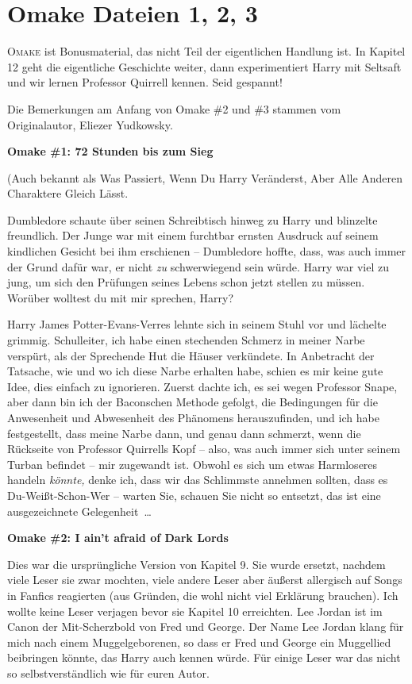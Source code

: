 \chapter{Omake Dateien 1, 2, 3}

\lettrine{\loq O}{make} ist Bonusmaterial, das nicht Teil der eigentlichen
Handlung ist. In Kapitel 12 geht die eigentliche Geschichte weiter, dann
experimentiert Harry mit Seltsaft und wir lernen Professor Quirrell kennen. Seid
gespannt!

Die Bemerkungen am Anfang von Omake \#2 und \#3 stammen vom Originalautor,
Eliezer Yudkowsky.

\textbf{Omake \#1: 72 Stunden bis zum Sieg}

(Auch bekannt als \glqq Was Passiert, Wenn Du Harry Veränderst, Aber Alle
Anderen Charaktere Gleich Lässt\grqq{}.

Dumbledore schaute über seinen Schreibtisch hinweg zu Harry und blinzelte
freundlich. Der Junge war mit einem furchtbar ernsten Ausdruck auf seinem
kindlichen Gesicht bei ihm erschienen – Dumbledore hoffte, dass, was auch immer
der Grund dafür war, er nicht \emph{zu} schwerwiegend sein würde. Harry war viel
zu jung, um sich den Prüfungen seines Lebens schon jetzt stellen zu müssen.
\glqq Worüber wolltest du mit mir sprechen, Harry?\grqq{}

Harry James Potter-Evans-Verres lehnte sich in seinem Stuhl vor und lächelte
grimmig. \glqq Schulleiter, ich habe einen stechenden Schmerz in meiner Narbe
verspürt, als der Sprechende Hut die Häuser verkündete. In Anbetracht der
Tatsache, wie und wo ich diese Narbe erhalten habe, schien es mir keine gute
Idee, dies einfach zu ignorieren. Zuerst dachte ich, es sei wegen Professor
Snape, aber dann bin ich der Baconschen Methode gefolgt, die Bedingungen für die
Anwesenheit und Abwesenheit des Phänomens herauszufinden, und ich habe
festgestellt, dass meine Narbe dann, und genau dann schmerzt, wenn die Rückseite
von Professor Quirrells Kopf – also, was auch immer sich unter seinem Turban
befindet – mir zugewandt ist. Obwohl es sich um etwas Harmloseres handeln
\emph{könnte,} denke ich, dass wir das Schlimmste annehmen sollten, dass es
Du-Weißt-Schon-Wer – warten Sie, schauen Sie nicht so entsetzt, das ist eine
ausgezeichnete Gelegenheit …\grqq{}

\textbf{Omake \#2: I ain't afraid of Dark Lords}

Dies war die ursprüngliche Version von Kapitel 9. Sie wurde ersetzt, nachdem
viele Leser sie zwar mochten, viele andere Leser aber äußerst allergisch auf
Songs in Fanfics reagierten (aus Gründen, die wohl nicht viel Erklärung
brauchen). Ich wollte keine Leser verjagen bevor sie Kapitel 10 erreichten. Lee
Jordan ist im Canon der Mit-Scherzbold von Fred und George. Der Name \grqq{} Lee
Jordan\grqq{} klang für mich nach einem Muggelgeborenen, so dass er Fred und
George ein Muggellied beibringen könnte, das Harry auch kennen würde. Für einige
Leser war das nicht so selbstverständlich wie für euren Autor.

